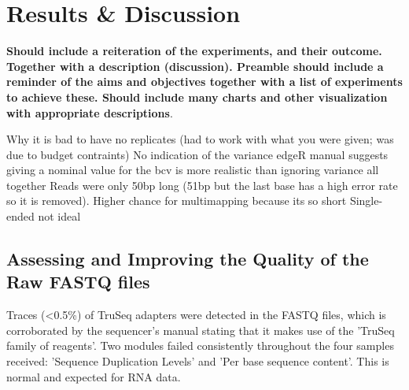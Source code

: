 \chapter{Results \& Discussion}

\textbf{Should include a reiteration of the experiments, and their outcome.  Together with a description (discussion).  Preamble should include a reminder of the aims and objectives together with a list of experiments to achieve these.  Should include many charts and other visualization with appropriate descriptions}.  


Why it is bad to have no replicates (had to work with what you were given; was due to budget contraints)
No indication of the variance
edgeR manual suggests giving a nominal value for the bcv is more realistic than ignoring variance all together
Reads were only 50bp long (51bp but the last base has a high error rate so it is removed). Higher chance for multimapping because its so short
Single-ended not ideal






\section{Assessing and Improving the Quality of the Raw FASTQ files}
\label{Assessing the Quality of the Raw FASTQ files}
Traces (<0.5\%) of TruSeq adapters were detected in the FASTQ files, which is corroborated by the sequencer's manual \citep{HiSeq2000} stating that it makes use of the 'TruSeq family of reagents'. 
Two modules failed consistently throughout the four samples received: 'Sequence Duplication Levels' and 'Per base sequence content'. This is normal and expected for RNA data.




